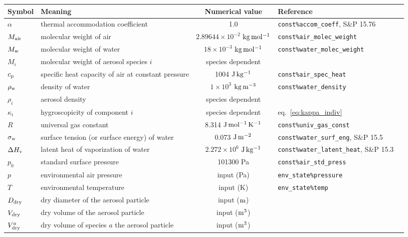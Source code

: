 \documentclass{article}
\begin{document}
\vspace{2cm}
\begin{tabular}{lp{4cm}clp{3cm}}
\hline Symbol & Meaning  & Numerical value &  Reference    \\
\hline             
$\alpha$   &  thermal accommodation coefficient    & 1.0 & \verb+const%accom_coeff+, S\&P 15.76 \\
$M_{\rm air} $      &  molecular weight of air      & $2.89644 \times 10^{-2} $  $\rm{kg \,mol^{-1}}$ &  \verb+const%air_molec_weight+   \\
$M_{\rm w} $    &  molecular weight of water        & $18\times10^{-3}$ $\rm{kg \, mol^{-1}}  $  &  \verb+const%water_molec_weight+    \\
$M_i $      &  molecular weight of aerosol species $i$  & species dependent &    \\
$c_{\rm p}$       &  specific heat capacity of air at constant pressure  & 1004 $\rm{J \, kg^{-1}}$ & \verb+const%air_spec_heat+     \\
$\rho_{\rm w}$ &  density of water & $1\times10^{3}$ $\rm{kg \, m^{-3}}  $ &   \verb+const%water_density+ \\ 
$ \rho_i$    &  aerosol density   & species dependent  &     \\
$\kappa_i$      &  hygroscopicity of component $i$   & species dependent  &  eq.~\ref{eq:kappa_indiv}   \\
$R$     &  universal gas constant  & 8.314 $\rm{J \, mol^{-1}\, K^{-1}}$   &  \verb+const%univ_gas_const+ \\
$\sigma_{\rm w}$     &  surface tension (or surface energy) of water  & 0.073 $\rm{J \, m^{-2}}$ & \verb+const%water_surf_eng+, S\&P 15.5  \\
$\Delta H_{\rm  v}$  & latent heat of vaporization of water   & $2.272\times10^{6}$ $\rm{J \, kg^{-1}}$ & \verb+const%water_latent_heat+, S\&P 15.3 \\ 
$p_0$ & standard surface pressure &  101300 Pa & \verb+const%air_std_press+ \\
$p$     &  environmental air pressure & input  (Pa) &  \verb+env_state%pressure+ \\
$T$     &  environmental temperature  & input  (K) &  \verb+env_state%temp+  \\
$D_{\rm dry}$       & dry diameter of the aerosol particle   & input ($\rm m$) &    \\
$V_{\rm dry}$       & dry volume of the aerosol particle   & input ($\rm m^3$) &    \\
$V^a_{\rm dry}$       & dry volume of species $a$ the aerosol particle   & input ($\rm m^3$) &    \\

\end{tabular}
\end{document}
